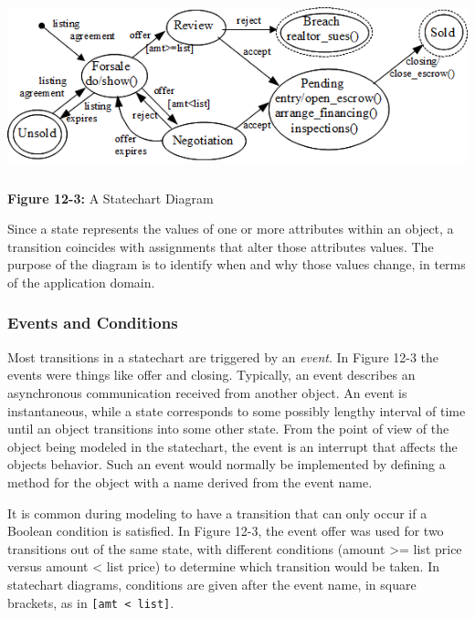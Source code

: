 \bigskip

\includegraphics[width=5.8in,height=2.0in]{ub-img/statechart.png}

{\sffamily\bfseries Figure 12-3:}
{\sffamily A Statechart Diagram}

\bigskip

Since a state represents the values of one or more attributes within an
object, a transition coincides with assignments that alter those
attributes{\textquotesingle} values. The purpose of the diagram is to
identify when and why those values change, in terms of the application
domain.

\subsubsection{Events and Conditions}

Most transitions in a statechart are triggered by an \textit{event}. In Figure 12-3 the events were things like
{\textquotedbl}offer{\textquotedbl} and
{\textquotedbl}closing.{\textquotedbl} Typically, an event describes an
asynchronous communication received from another object. An event is
instantaneous, while a state corresponds to some possibly lengthy
interval of time until an object transitions into some other state.
From the point of view of the object being modeled in the statechart,
the event is an interrupt that affects the object{\textquotesingle}s
behavior. Such an event would normally be implemented by defining a
method for the object with a name derived from the event name.

It is common during modeling to have a transition that can only
occur if a Boolean condition is satisfied. In Figure 12-3,
the event offer was used for two transitions out of the same state,
with different conditions (amount {\textgreater}= list price versus
amount {\textless} list price) to determine which transition would be
taken. In statechart diagrams, conditions are given after the event
name, in square brackets, as in \texttt{[amt {\textless} list]}.

